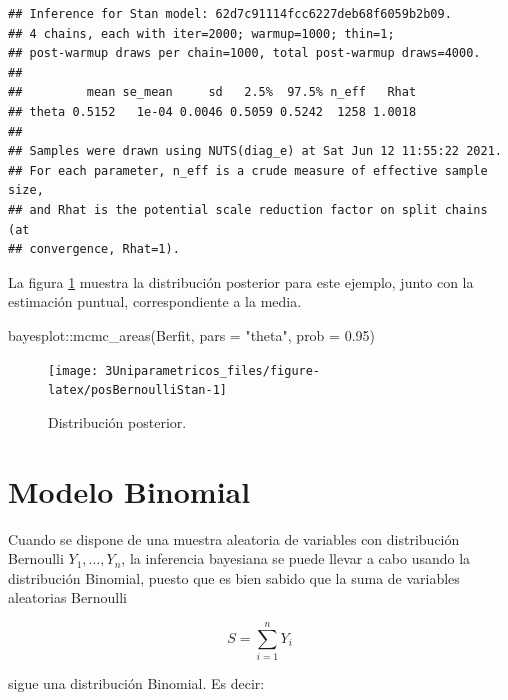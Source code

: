 \documentclass[
  10pt,
  spanish,
]{book}
\newenvironment{Shaded}{\begin{snugshade}}{\end{snugshade}}
\newcommand{\AttributeTok}[1]{\textcolor[rgb]{0.77,0.63,0.00}{#1}}
\newcommand{\FloatTok}[1]{\textcolor[rgb]{0.00,0.00,0.81}{#1}}
\newcommand{\FunctionTok}[1]{\textcolor[rgb]{0.00,0.00,0.00}{#1}}
\newcommand{\NormalTok}[1]{#1}
\newcommand{\SpecialCharTok}[1]{\textcolor[rgb]{0.00,0.00,0.00}{#1}}
\newcommand{\StringTok}[1]{\textcolor[rgb]{0.31,0.60,0.02}{#1}}
\theoremstyle{definition}
\theoremstyle{definition}
\theoremstyle{definition}
\theoremstyle{definition}
\theoremstyle{remark}
\begin{document}
\begin{verbatim}
## Inference for Stan model: 62d7c91114fcc6227deb68f6059b2b09.
## 4 chains, each with iter=2000; warmup=1000; thin=1; 
## post-warmup draws per chain=1000, total post-warmup draws=4000.
## 
##         mean se_mean     sd   2.5%  97.5% n_eff   Rhat
## theta 0.5152   1e-04 0.0046 0.5059 0.5242  1258 1.0018
## 
## Samples were drawn using NUTS(diag_e) at Sat Jun 12 11:55:22 2021.
## For each parameter, n_eff is a crude measure of effective sample size,
## and Rhat is the potential scale reduction factor on split chains (at 
## convergence, Rhat=1).
\end{verbatim}

La figura \ref{fig:posBernoulliStan} muestra la distribución posterior para este ejemplo, junto con la estimación puntual, correspondiente a la media.

\begin{Shaded}
\begin{Highlighting}[]
\NormalTok{bayesplot}\SpecialCharTok{::}\FunctionTok{mcmc\_areas}\NormalTok{(Berfit, }\AttributeTok{pars =} \StringTok{"theta"}\NormalTok{, }
                      \AttributeTok{prob =} \FloatTok{0.95}\NormalTok{)}
\end{Highlighting}
\end{Shaded}

\begin{figure}

{\centering \texttt{[image: 3Uniparametricos\_files/figure-latex/posBernoulliStan-1]} 

}

\caption{Distribución posterior.}\label{fig:posBernoulliStan}
\end{figure}

\hypertarget{modelo-binomial}{%
\section{Modelo Binomial}\label{modelo-binomial}}

Cuando se dispone de una muestra aleatoria de variables con distribución
Bernoulli \(Y_1,\ldots,Y_n\), la inferencia bayesiana se puede llevar a
cabo usando la distribución Binomial, puesto que es bien sabido que la
suma de variables aleatorias Bernoulli

\begin{equation*}
S=\sum_{i=1}^nY_i
\end{equation*}

sigue una distribución Binomial. Es decir:
\end{document}
